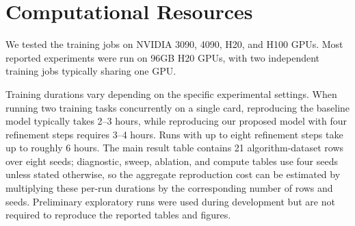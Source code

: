 \documentclass{article}
\begin{document}
\begin{table}[h]
\centering
\scriptsize
\setlength{\tabcolsep}{2.5pt}
\caption{Correlation between CRL critic scores and maze graph distance. Recurrence does not uniformly improve graph-distance alignment, even when it improves control.}
\label{tab:graph_corr_app}
\end{table}
\FloatBarrier


\section{Computational Resources}\label{apd:compute-resources}
We tested the training jobs on NVIDIA 3090, 4090, H20, and H100 GPUs. Most reported experiments were run on 96GB H20 GPUs, with two independent training jobs typically sharing one GPU.

Training durations vary depending on the specific experimental settings. When running two training tasks concurrently on a single card, reproducing the baseline model typically takes 2--3 hours, while reproducing our proposed model with four refinement steps requires 3--4 hours. Runs with up to eight refinement steps take up to roughly 6 hours.
The main result table contains 21 algorithm-dataset rows over eight seeds; diagnostic, sweep, ablation, and compute tables use four seeds unless stated otherwise, so the aggregate reproduction cost can be estimated by multiplying these per-run durations by the corresponding number of rows and seeds.
Preliminary exploratory runs were used during development but are not required to reproduce the reported tables and figures.
\end{document}

